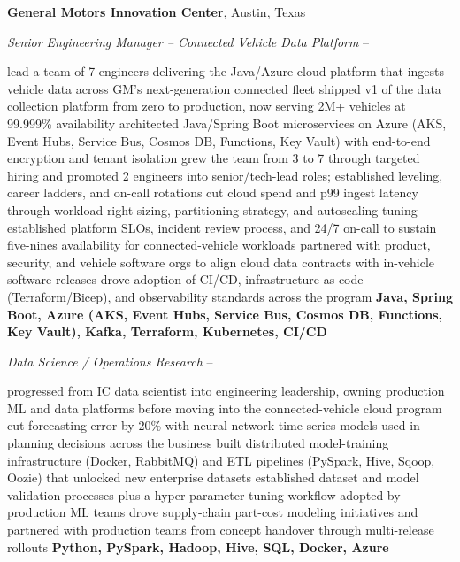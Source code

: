 \documentclass[a4paper,10pt,oneside]{article}
\begin{document}
\begin{body}
{\textbf{General Motors Innovation Center}},
Austin, Texas
\par
\Item
\textit{Senior Engineering Manager -- Connected Vehicle Data Platform}
\hfill
{} --
\begin{detail}
\BulletItem
lead a team of 7 engineers delivering the Java/Azure cloud platform that ingests vehicle data across GM's next-generation connected fleet
\BulletItem
shipped v1 of the data collection platform from zero to production, now serving 2M+ vehicles at 99.999\% availability
\BulletItem
architected Java/Spring Boot microservices on Azure (AKS, Event Hubs, Service Bus, Cosmos DB, Functions, Key Vault) with end-to-end encryption and tenant isolation
\BulletItem
grew the team from 3 to 7 through targeted hiring and promoted 2 engineers into senior/tech-lead roles; established leveling, career ladders, and on-call rotations
\BulletItem
cut cloud spend and p99 ingest latency through workload right-sizing, partitioning strategy, and autoscaling tuning
\BulletItem
established platform SLOs, incident review process, and 24/7 on-call to sustain five-nines availability for connected-vehicle workloads
\BulletItem
partnered with product, security, and vehicle software orgs to align cloud data contracts with in-vehicle software releases
\BulletItem
drove adoption of CI/CD, infrastructure-as-code (Terraform/Bicep), and observability standards across the program
\Item
\textbf{Java, Spring Boot, Azure (AKS, Event Hubs, Service Bus, Cosmos DB, Functions, Key Vault), Kafka, Terraform, Kubernetes, CI/CD}

\end{detail}
\SmallEntryGap
\Item
\textit{Data Science / Operations Research}
\hfill
{} --
\begin{detail}
\BulletItem
progressed from IC data scientist into engineering leadership, owning production ML and data platforms before moving into the connected-vehicle cloud program
\BulletItem
cut forecasting error by 20\% with neural network time-series models used in planning decisions across the business
\BulletItem
built distributed model-training infrastructure (Docker, RabbitMQ) and ETL pipelines (PySpark, Hive, Sqoop, Oozie) that unlocked new enterprise datasets
\BulletItem
established dataset and model validation processes plus a hyper-parameter tuning workflow adopted by production ML teams
\BulletItem
drove supply-chain part-cost modeling initiatives and partnered with production teams from concept handover through multi-release rollouts
\Item
\textbf{Python, PySpark, Hadoop, Hive, SQL, Docker, Azure}


\end{detail}
\end{body}
\end{document}
